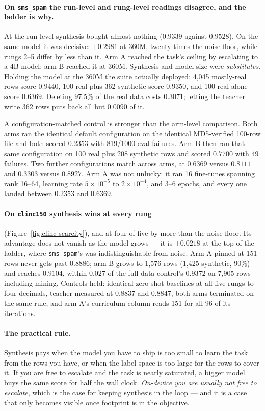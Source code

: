 \documentclass[sigconf,10pt]{acmart}
\newcommand{\tsk}[1]{\texttt{#1}}
\begin{document}
\paragraph{On \tsk{sms\_spam} the run-level and rung-level readings disagree, and the ladder is
why.} At the run level synthesis bought almost nothing ($0.9339$ against $0.9528$). On the
same model it was decisive: $+0.2981$ at 360M, twenty times the noise floor, while rungs 2--5
differ by less than it. Arm A reached the task's ceiling by escalating to a 4B model; arm B
reached it at 360M. Synthesis and model size were \emph{substitutes}. Holding the model at the
360M the suite actually deployed: 4{,}045 mostly-real rows score $0.9440$, 100 real plus 362
synthetic score $0.9350$, and 100 real alone score $0.6369$. Deleting 97.5\% of the real data
costs $0.3071$; letting the teacher write 362 rows puts back all but $0.0090$ of it.

A configuration-matched control is stronger than the arm-level comparison. Both arms ran the
identical default configuration on the identical MD5-verified 100-row file and both scored
$0.2353$ with 819/1000 eval failures. Arm B then ran that same configuration on 100 real plus
208 synthetic rows and scored $0.7700$ with 49 failures. Two further configurations match
across arms, at $0.6369$ versus $0.8111$ and $0.3303$ versus $0.8927$. Arm A was not unlucky:
it ran 16 fine-tunes spanning rank 16--64, learning rate $5\!\times\!10^{-5}$ to
$2\!\times\!10^{-4}$, and 3--6 epochs, and every one landed between $0.2353$ and $0.6369$.

\paragraph{On \tsk{clinc150} synthesis wins at every rung} (Figure~\ref{fig:clinc-scarcity}),
and at four of five by more than the noise floor. Its advantage does not vanish as the model grows --- it is $+0.0218$ at the
top of the ladder, where \tsk{sms\_spam}'s was indistinguishable from noise. Arm A pinned at
151 rows never gets past $0.8886$; arm B grows to 1{,}576 rows (1{,}425 synthetic, 90\%) and
reaches $0.9104$, within $0.027$ of the full-data control's $0.9372$ on 7{,}905 rows including
mining. Controls held: identical zero-shot baselines at all five rungs to four decimals,
teacher measured at $0.8837$ and $0.8847$, both arms terminated on the same rule, and arm A's
curriculum column reads 151 for all 96 of its iterations.

\paragraph{The practical rule.} Synthesis pays when the model you have to ship is too small to
learn the task from the rows you have, or when the label space is too large for the rows to
cover it. If you are free to escalate and the task is nearly saturated, a bigger model buys
the same score for half the wall clock. \emph{On-device you are usually not free to escalate},
which is the case for keeping synthesis in the loop --- and it is a case that only becomes
visible once footprint is in the objective.
\end{document}
